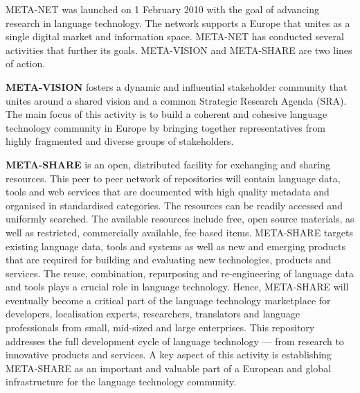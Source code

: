 \begin{multicols}{2}
META-NET was launched on 1 February 2010 with the goal of advancing research in language technology. The network supports a Europe that unites as a single digital market and information space. META-NET has conducted several activities that further its goals. META-VISION and META-SHARE are two lines of action.

\textbf{META-VISION} fosters a dynamic and influential stakeholder community that unites around a shared vision and a common Strategic Research Agenda (SRA). The main focus of this activity is to build a coherent and cohesive language technology community in Europe by bringing together representatives from highly fragmented and diverse groups of stakeholders.

\textbf{META-SHARE} is an open, distributed facility for exchanging and sharing resources. This peer to peer network of repositories will contain language data, tools and web services that are documented with high quality metadata and organised in standardised categories. The resources can be readily accessed and uniformly searched. The available resources include free, open source materials, as well as restricted, commercially available, fee based items. META-SHARE targets existing language data, tools and systems as well as new and emerging products that are required for building and evaluating new technologies, products and services. The reuse, combination, repurposing and re-engineering of language data and tools plays a crucial role in language technology. Hence, META-SHARE will eventually become a critical part of the language technology marketplace for developers, localisation experts, researchers, translators and language professionals from small, mid-sized and large enterprises. This repository addresses the full development cycle of language technology --- from research to innovative products and services. A key aspect of this activity is establishing META-SHARE as an important and valuable part of a European and global infrastructure for the language technology community.


\end{multicols}

\cleardoublepage

\appendix
{}



  
\cleardoublepage

\label{metanetmembers}

